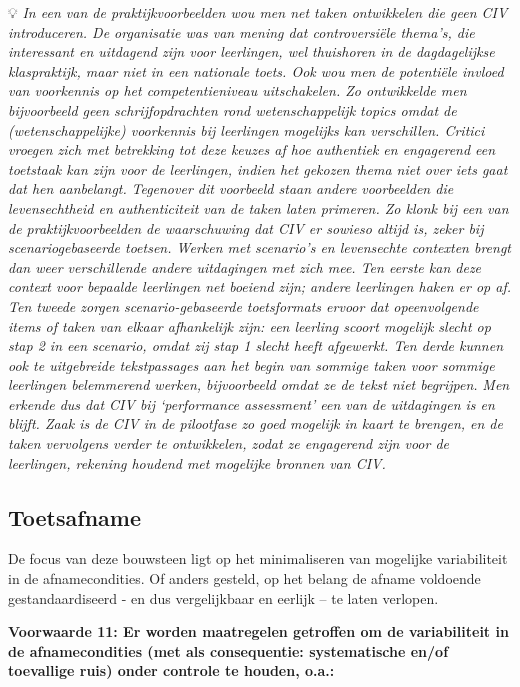 \documentclass[
  letterpaper,
]{report}
\begin{document}
💡 \emph{In een van de praktijkvoorbeelden wou men net taken ontwikkelen
die geen CIV introduceren. De organisatie was van mening dat
controversiële thema's, die interessant en uitdagend zijn voor
leerlingen, wel thuishoren in de dagdagelijkse klaspraktijk, maar niet
in een nationale toets. Ook wou men de potentiële invloed van voorkennis
op het competentieniveau uitschakelen. Zo ontwikkelde men bijvoorbeeld
geen schrijfopdrachten rond wetenschappelijk topics omdat de
(wetenschappelijke) voorkennis bij leerlingen mogelijks kan verschillen.
Critici vroegen zich met betrekking tot deze keuzes af hoe authentiek en
engagerend een toetstaak kan zijn voor de leerlingen, indien het gekozen
thema niet over iets gaat dat hen aanbelangt.} \emph{Tegenover dit
voorbeeld staan andere voorbeelden die levensechtheid en authenticiteit
van de taken laten primeren. Zo klonk bij een van de praktijkvoorbeelden
de waarschuwing dat CIV er sowieso altijd is, zeker bij
scenariogebaseerde toetsen. Werken met scenario's en levensechte
contexten brengt dan weer verschillende andere uitdagingen met zich mee.
Ten eerste kan deze context voor bepaalde leerlingen net boeiend zijn;
andere leerlingen haken er op af. Ten tweede zorgen scenario-gebaseerde
toetsformats ervoor dat opeenvolgende items of taken van elkaar
afhankelijk zijn: een leerling scoort mogelijk slecht op stap 2 in een
scenario, omdat zij stap 1 slecht heeft afgewerkt. Ten derde kunnen ook
te uitgebreide tekstpassages aan het begin van sommige taken voor
sommige leerlingen belemmerend werken, bijvoorbeeld omdat ze de tekst
niet begrijpen.} \emph{Men erkende dus dat CIV bij `performance
assessment' een van de uitdagingen is en blijft. Zaak is de CIV in de
pilootfase zo goed mogelijk in kaart te brengen, en de taken vervolgens
verder te ontwikkelen, zodat ze engagerend zijn voor de leerlingen,
rekening houdend met mogelijke bronnen van CIV.}

\hypertarget{toetsafname}{%
\subsection{Toetsafname}\label{toetsafname}}

De focus van deze bouwsteen ligt op het minimaliseren van mogelijke
variabiliteit in de afnamecondities. Of anders gesteld, op het belang de
afname voldoende gestandaardiseerd - en dus vergelijkbaar en eerlijk --
te laten verlopen.

\textbf{Voorwaarde 11: Er worden maatregelen getroffen om de
variabiliteit in de afnamecondities (met als consequentie: systematische
en/of toevallige ruis) onder controle te houden, o.a.:}
\end{document}

